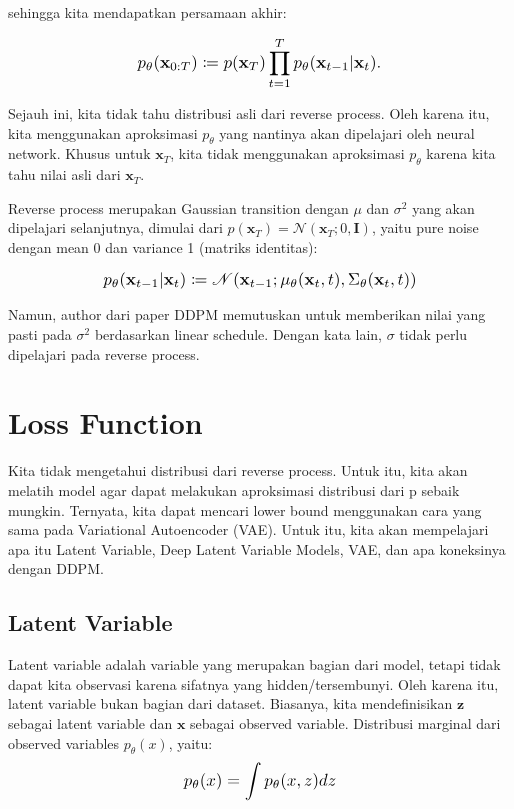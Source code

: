 \documentclass{article}
\newcommand*{\Scale}[2][4]{\scalebox{#1}{\ensuremath{#2}}}
\begin{document}
sehingga kita mendapatkan persamaan akhir:

\begin{equation}
\Scale[1.2]{ \displaystyle
p_\theta(\textbf{x}_{0:T}) \coloneq p(\textbf{x}_T) \displaystyle \prod_{t=1}^{T} p_\theta(\textbf{x}_{t-1}|\textbf{x}_{t}). }
\end{equation}

Sejauh ini, kita tidak tahu distribusi asli dari reverse process. Oleh karena itu, kita menggunakan aproksimasi $ p_\theta $ yang nantinya akan dipelajari oleh neural network. Khusus untuk $ \textbf{x}_{T} $, kita tidak menggunakan aproksimasi $ p_\theta $ karena kita tahu nilai asli dari $ \textbf{x}_{T} $.

Reverse process merupakan Gaussian transition dengan $ \mu $ dan $ \sigma^2 $ yang akan dipelajari selanjutnya, dimulai dari $ p(\textbf{x}_T) = \mathscr{N}(\textbf{x}_T;0,\textbf{I}) $, yaitu pure noise dengan mean 0 dan variance 1 (matriks identitas):

\begin{equation}
\Scale[1.2]{ \displaystyle
p_\theta(\textbf{x}_{t-1}|\textbf{x}_{t}) \coloneq \mathscr{N}(\textbf{x}_{t-1};\mu_\theta(\textbf{x}_{t},t),\Sigma_\theta(\textbf{x}_t,t)) }
\end{equation}

Namun, author dari paper DDPM memutuskan untuk memberikan nilai yang pasti pada $ \sigma^2 $ berdasarkan linear schedule. Dengan kata lain, $ \sigma $ tidak perlu dipelajari pada reverse process.


\section{Loss Function}


Kita tidak mengetahui distribusi dari reverse process. Untuk itu, kita akan melatih model agar dapat melakukan aproksimasi distribusi dari p sebaik mungkin. Ternyata, kita dapat mencari lower bound menggunakan cara yang sama pada Variational Autoencoder (VAE). Untuk itu, kita akan mempelajari apa itu Latent Variable, Deep Latent Variable Models, VAE, dan apa koneksinya dengan DDPM.


\subsection{Latent Variable}


Latent variable adalah variable yang merupakan bagian dari model, tetapi tidak dapat kita observasi karena sifatnya yang hidden/tersembunyi. Oleh karena itu, latent variable bukan bagian dari dataset. Biasanya, kita mendefinisikan $ \textbf{z} $ sebagai latent variable dan $ \textbf{x} $ sebagai observed variable. Distribusi marginal dari observed variables $ p_\theta(x) $, yaitu:
\begin{equation}
\Scale[1.2]{\displaystyle p_\theta(x) = \int p_\theta(x,z) dz }
\end{equation}
\end{document}
